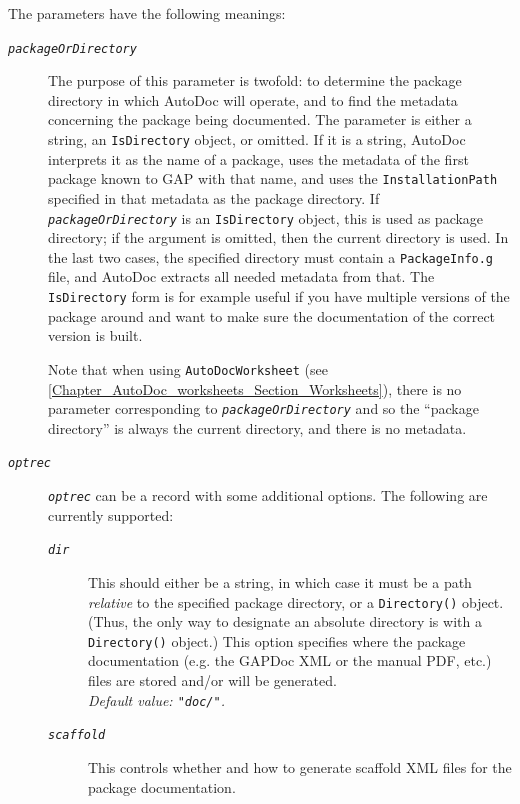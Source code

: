 \documentclass[a4paper,11pt]{report}
\begin{document}
{{{ The parameters have the following meanings: 
\begin{description}
\item[{\mbox{\texttt{\mdseries\slshape packageOrDirectory}}}]  The purpose of this parameter is twofold: to determine the package directory
in which \textsf{AutoDoc} will operate, and to find the metadata concerning the package being
documented. The parameter is either a string, an \texttt{IsDirectory} object, or omitted. If it is a string, \textsf{AutoDoc} interprets it as the name of a package, uses the metadata of the first package
known to \textsf{GAP} with that name, and uses the \texttt{InstallationPath} specified in that metadata as the package directory. If \mbox{\texttt{\mdseries\slshape packageOrDirectory}} is an \texttt{IsDirectory} object, this is used as package directory; if the argument is omitted, then
the current directory is used. In the last two cases, the specified directory
must contain a \texttt{PackageInfo.g} file, and \textsf{AutoDoc} extracts all needed metadata from that. The \texttt{IsDirectory} form is for example useful if you have multiple versions of the package around
and want to make sure the documentation of the correct version is built. 

 Note that when using \texttt{AutoDocWorksheet} (see \ref{Chapter_AutoDoc_worksheets_Section_Worksheets}), there is no parameter corresponding to \mbox{\texttt{\mdseries\slshape packageOrDirectory}} and so the ``package directory'' is always the current directory, and there is no metadata. 
\item[{\mbox{\texttt{\mdseries\slshape optrec}}}]  \mbox{\texttt{\mdseries\slshape optrec}} can be a record with some additional options. The following are currently
supported: 
\begin{description}
\item[{\mbox{\texttt{\mdseries\slshape dir}}}]  This should either be a string, in which case it must be a path \emph{relative} to the specified package directory, or a \texttt{Directory()} object. (Thus, the only way to designate an absolute directory is with a \texttt{Directory()} object.) This option specifies where the package documentation (e.g. the \textsf{GAPDoc} XML or the manual PDF, etc.) files are stored and/or will be generated. \\
 \emph{Default value: \texttt{"doc/"}.} 
\item[{\mbox{\texttt{\mdseries\slshape scaffold}}}]  This controls whether and how to generate scaffold XML files for the package
documentation. 


\end{description}
\end{description}}}}
\end{document}
